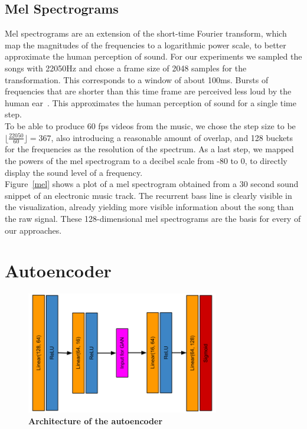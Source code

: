     \subsection{Mel Spectrograms}
    \indent Mel spectrograms are an extension of the short-time Fourier transform, which map the magnitudes of the frequencies to a logarithmic power scale, to better approximate the human perception of sound.
    For our experiments we sampled the songs with 22050Hz and chose a frame size of 2048 samples for the transformation.
    This corresponds to a window of about 100ms. Bursts of frequencies that are shorter than this time frame are perceived less loud by the human ear~\cite{Acoustics}.
    This approximates the human perception of sound for a single time step.\\
    To be able to produce 60 fps videos from the music, we chose the step size to be $\lfloor \frac{22050}{60} \rfloor = 367$, also introducing a reasonable amount of overlap, and 128 buckets for the frequencies as the resolution of the spectrum.
    As a last step, we mapped the powers of the mel spectrogram to a decibel scale from -80 to 0, to directly display the sound level of a frequency.\\ 
    \indent Figure~\ref{mel} shows a plot of a mel spectrogram obtained from a 30 second sound snippet of an electronic music track. 
    The recurrent bass line is clearly visible in the visualization, already yielding more visible information about the song than the raw signal.
    These 128-dimensional mel spectrograms are the basis for every of our approaches.

\section{Autoencoder}
    
    \begin{figure}[!t]
        \centering
        \includegraphics[width=0.75\textwidth]{images/autoencoder}    
        \caption{\textbf{Architecture of the autoencoder}}
        \label{autoencoder}
    \end{figure}
    
